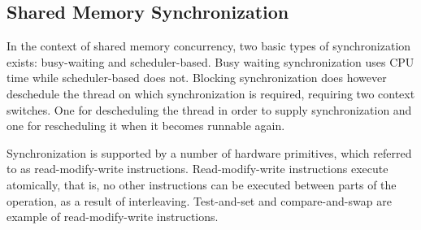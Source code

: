 \subsection{Shared Memory Synchronization}
In the context of shared memory concurrency, two basic types of synchronization exists: busy-waiting and scheduler-based\cite[p. 1990]{scott2011sync}. Busy waiting synchronization uses \ac{CPU} time while scheduler-based does not. Blocking synchronization does however deschedule the thread on which synchronization is required, requiring two context switches. One for descheduling the thread in order to supply synchronization and one for rescheduling it when it becomes runnable again.

Synchronization is supported by a number of hardware primitives, which referred to as read-modify-write instructions\cite[p. 1990]{scott2011sync}. Read-modify-write instructions execute atomically, that is, no other instructions can be executed between parts of the operation, as a result of interleaving. Test-and-set and compare-and-swap are example of read-modify-write instructions.  

\worksheetend
